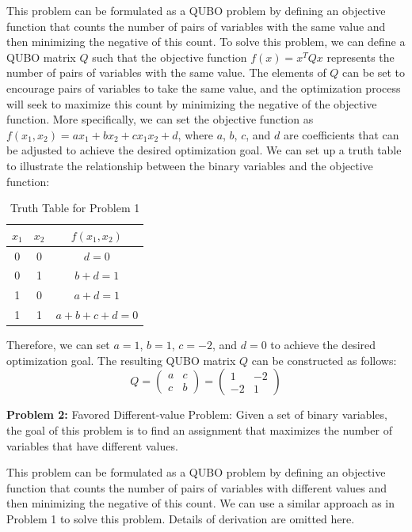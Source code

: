 This problem can be formulated as a QUBO problem by defining an objective function that counts the number of pairs of variables with the same value and then minimizing the negative of this count.
To solve this problem, we can define a QUBO matrix $Q$ such that the objective function $f(x) = x^T Q x$ represents the number of pairs of variables with the same value. The elements of $Q$ can be set to encourage pairs of variables to take the same value, and the optimization process will seek to maximize this count by minimizing the negative of the objective function.
More specifically, we can set the objective function as $f(x_1, x_2)=ax_1+bx_2+cx_1x_2+d$, where $a$, $b$, $c$, and $d$ are coefficients that can be adjusted to achieve the desired optimization goal. We can set up a truth table to illustrate the relationship between the binary variables and the objective function:
\begin{table}[ht]
\centering
\caption{Truth Table for Problem 1}
\label{tab:truth_table_1}
\begin{tabular}{|c|c|c|}
\hline
$x_1$ & $x_2$ & $f(x_1, x_2)$ \\
\hline
0 & 0 & $d=0$ \\
0 & 1 & $b+d=1$ \\
1 & 0 & $a+d=1$ \\
1 & 1 & $a+b+c+d=0$ \\
\hline
\end{tabular}
\end{table}

Therefore, we can set $a=1$, $b=1$, $c=-2$, and $d=0$ to achieve the desired optimization goal. The resulting QUBO matrix $Q$ can be constructed as follows:
\begin{equation}
Q = \begin{pmatrix}
a & c \\
c & b
\end{pmatrix} = \begin{pmatrix}
1 & -2 \\
-2 & 1
\end{pmatrix}
\end{equation}

\textbf{Problem 2:} Favored Different-value Problem: Given a set of binary variables, the goal of this problem is to find an assignment that maximizes the number of variables that have different values.

This problem can be formulated as a QUBO problem by defining an objective function that counts the number of pairs of variables with different values and then minimizing the negative of this count. We can use a similar approach as in Problem 1 to solve this problem. Details of derivation are omitted here.

